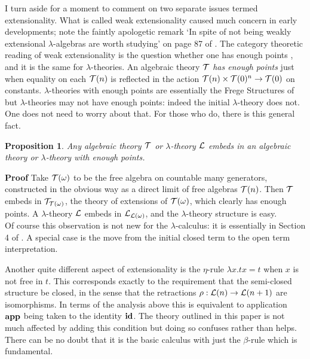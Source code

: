 \documentclass[12pt, amstex, amssymb]{article}
\newtheorem{proposition}[theorem]{Proposition}
\newcommand{\mcat}{\cal}
\begin{document}
I turn aside for a moment to
comment on two separate issues termed extensionality.
What is called weak extensionality caused much concern
in early developments; note the faintly apologetic remark
`In spite of not being weakly extensional $\lambda$-algebras
are worth studying' on page 87 of \cite{Bar84}.
The category theoretic reading of weak extensionality
is the question whether one has enough points
\cite{Scott80}, and it is the same for $\lambda$-theories.
An algebraic theory $\mcat T$ {\em has enough points} 
just when equality on each ${\mcat T}(n)$ is reflected in
the action
${\mcat T}(n) \times {\mcat T}(0)^n \to {\mcat T}(0)$
on constants. $\lambda$-theories with enough points are
essentially the Frege Structures of \cite{Aczel80}
but $\lambda$-theories may not have enough
points: indeed the initial $\lambda$-theory does not. 
One does not need to worry about that. For those who do,
there is this general fact.
\begin{proposition}
Any algebraic theory $\mcat T$ or $\lambda$-theory
$\mcat L$ embeds in an algebraic theory or $\lambda$-theory 
with enough points. 
\end{proposition}
{\bf Proof} Take 
${\mcat T}(\omega)$ to be the free algebra on countable 
many generators, constructed in the obvious
way as a direct limit of free algebras ${\mcat T}(n)$.
Then $\mcat T$ embeds in ${\mcat T}_{{\mcat T}(\omega)}$,
the theory of extensions of ${\mcat T}(\omega)$, which
clearly has enough points. A $\lambda$-theory $\mcat L$ embeds 
in ${\mcat L}_{{\mcat L}(\omega)}$, and the $\lambda$-theory
structure is easy.\\[0.4em]
Of course this observation is not new for the $\lambda$-calculus: it
is essentially in Section 4 of \cite{BK80}.
A special case is the move from the initial closed term to the open term 
interpretation.

Another quite different aspect of extensionality
is the $\eta$-rule $\lambda x. tx = t$
when $x$ is not free in $t$. This
corresponds exactly to the requirement that the semi-closed 
structure be closed, in the sense that the retractions
$\rho: {\mcat L}(n) \to {\mcat L}(n+1)$ are isomorphisms.
In terms of the analysis above this is equivalent to 
application ${\bf app}$ being taken to the identity $\bf id$.
The theory outlined in this paper is not much affected by adding
this condition but doing so confuses
rather than helps. There can be no doubt that it is the basic
calculus with just the $\beta$-rule which is fundamental. 
\end{document}
